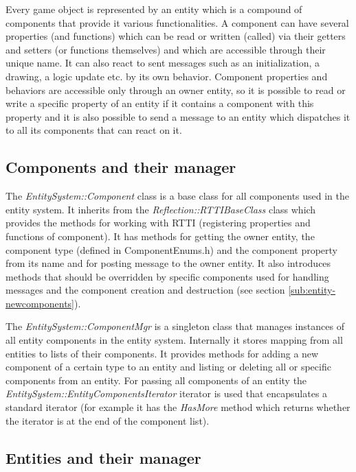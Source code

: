 Every game object is represented by an entity which is a compound of components that provide it various functionalities. A component can have several properties (and functions) which can be read or written (called) via their getters and setters (or functions themselves) and which are accessible through their unique name. It can also react to sent messages such as an initialization, a drawing, a logic update etc. by its own behavior. Component properties and behaviors are accessible only through an owner entity, so it is possible to read or write a specific property of an entity if it contains a component with this property and it is also possible to send a message to an entity which dispatches it to all its components that can react on it.

\subsection{Components and their manager}

The \emph{EntitySystem::Component} class is a base class for all components used in the entity system. It inherits from the \emph{Reflection::RTTIBaseClass} class which provides the methods for working with RTTI (registering properties and functions of component). It has methods for getting the owner entity, the component type (defined in ComponentEnums.h) and the component property from its name and for posting message to the owner entity. It also introduces methods that should be overridden by specific components used for handling messages and the component creation and destruction (see section \ref{sub:entity-newcomponents}).

The \emph{EntitySystem::ComponentMgr} is a singleton class that manages instances of all entity components in the entity system. Internally it stores mapping from all entities to lists of their components. It provides methods for adding a new component of a certain type to an entity and listing or deleting all or specific components from an entity. For passing all components of an entity the \emph{EntitySystem::EntityComponentsIterator} iterator is used that encapsulates a standard iterator (for example it has the \emph{HasMore} method which returns whether the iterator is at the end of the component list).

\subsection{Entities and their manager}

